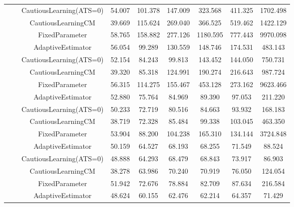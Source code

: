 \begin{table}[!h]
\begin{tabular}[t]{ccccccccc}
 &  & CautiousLearning(ATS=0) & 54.007 & 101.378 & 147.009 & 323.568 & 411.325 & 1702.498\\

 &  & CautiousLearningCM & 39.669 & 115.624 & 269.040 & 366.525 & 519.462 & 1422.129\\

 & \multirow[t]{-4}{*}{\centering\arraybackslash 0.25} & FixedParameter & 58.765 & 158.882 & 277.126 & 1180.595 & 777.443 & 9970.098\\
\cmidrule{2-9}
 &  & AdaptiveEstimator & 56.054 & 99.289 & 130.559 & 148.746 & 174.531 & 483.143\\

 &  & CautiousLearning(ATS=0) & 52.154 & 84.243 & 99.813 & 143.452 & 144.050 & 750.731\\

 &  & CautiousLearningCM & 39.320 & 85.318 & 124.991 & 190.274 & 216.643 & 987.724\\

 & \multirow[t]{-4}{*}{\centering\arraybackslash 0.35} & FixedParameter & 56.315 & 114.275 & 155.467 & 453.128 & 273.162 & 9623.466\\
\cmidrule{2-9}
 &  & AdaptiveEstimator & 52.880 & 75.764 & 84.969 & 89.390 & 97.053 & 211.220\\

 &  & CautiousLearning(ATS=0) & 50.233 & 72.719 & 80.516 & 84.663 & 93.932 & 168.183\\

 &  & CautiousLearningCM & 38.719 & 72.328 & 85.484 & 99.338 & 103.045 & 463.350\\

 & \multirow[t]{-4}{*}{\centering\arraybackslash 0.50} & FixedParameter & 53.904 & 88.200 & 104.238 & 165.310 & 134.144 & 3724.848\\
\cmidrule{2-9}
 &  & AdaptiveEstimator & 50.159 & 64.527 & 68.193 & 68.255 & 71.549 & 88.524\\

 &  & CautiousLearning(ATS=0) & 48.888 & 64.293 & 68.479 & 68.843 & 73.917 & 86.903\\

 &  & CautiousLearningCM & 38.278 & 63.986 & 70.240 & 70.919 & 76.050 & 124.054\\

 & \multirow[t]{-4}{*}{\centering\arraybackslash 0.75} & FixedParameter & 51.942 & 72.676 & 78.884 & 82.709 & 87.634 & 216.584\\
\cmidrule{2-9}
 &  & AdaptiveEstimator & 48.624 & 60.155 & 62.476 & 62.214 & 64.357 & 71.429\\


\end{tabular}
\end{table}
